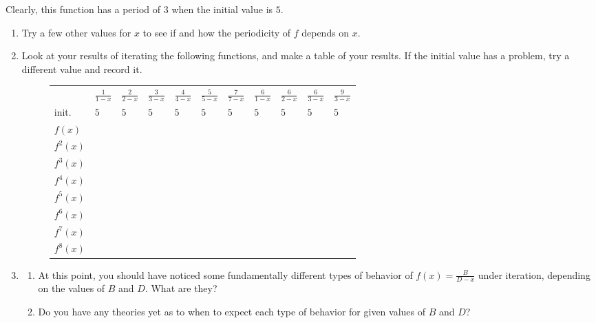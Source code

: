 \documentclass[../gatm.tex]{subfiles}
\begin{document}
\noindent Clearly, this function has a period of $3$ when the initial value is $5$.
\begin{enumerate}
\setcounter{enumi}{\value{problem_i}}
\item Try a few other values for $x$ to see if and how the periodicity of $f$ depends on $x$.
\item Look at your results of iterating the following functions, and make a table of your results. If the initial value has a problem, try a different value and record it.

\begin{figure}[h]
	\begin{center}
		\begin{minipage}[b]{\textwidth}
			\centering
			\renewcommand*{\arraystretch}{1.25}
			\begin{tabular}{l|llllllllll}
				\hline
				& $\frac{1}{1-x}$ & $\frac{2}{2-x}$ & $\frac{3}{3-x}$ & $\frac{4}{4-x}$ & $\frac{5}{5-x}$ & $\frac{7}{7-x}$ & $\frac{6}{1-x}$ & $\frac{6}{2-x}$ & $\frac{6}{3-x}$ & $\frac{9}{3-x}$ \\
				\rowcolor{light-gray}
				init.    & $5$   & $5$   & $5$ & $5$ & $5$ & $5$ & $5$ & $5$ & $5$ & $5$ \\
				$f(x)$   &       &       &   &   &   &   &   &   &   &   \\
				\rowcolor{light-gray}
				$f^2(x)$ &       &       &   &   &   &   &   &   &   &   \\
				$f^3(x)$ &       &       &   &   &   &   &   &   &   &   \\
				\rowcolor{light-gray}
				$f^4(x)$ &       &       &   &   &   &   &   &   &   &   \\
				$f^5(x)$ &       &       &   &   &   &   &   &   &   &   \\
				\rowcolor{light-gray}
				$f^6(x)$ &       &       &   &   &   &   &   &   &   &   \\
				$f^7(x)$ &       &       &   &   &   &   &   &   &   &   \\
				\rowcolor{light-gray}
				$f^8(x)$ &       &       &   &   &   &   &   &   &   &   \\ \hline
			\end{tabular}
		\end{minipage}
	\end{center}
\end{figure}

\item \begin{enumerate}
\item At this point, you should have noticed some fundamentally different types of behavior of $f(x)=\frac{B}{D-x}$ under iteration, depending on the values of $B$ and $D$. What are they?
\item Do you have any theories yet as to when to expect each type of behavior for given values of $B$ and $D$? 
\end{enumerate}
\setcounter{problem_i}{\value{enumi}}
\end{enumerate}
\end{document}
